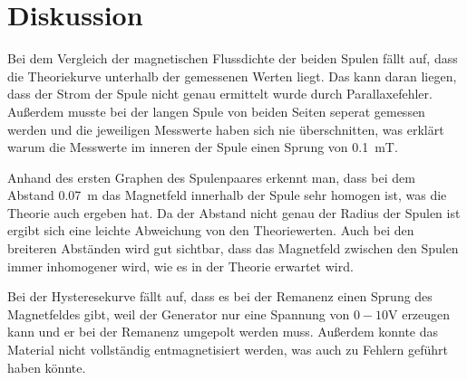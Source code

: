 \section{Diskussion}

Bei dem Vergleich der magnetischen Flussdichte der beiden Spulen fällt auf, dass
die Theoriekurve unterhalb der gemessenen Werten liegt. Das kann daran liegen, dass
der Strom der Spule nicht genau ermittelt wurde durch Parallaxefehler. Außerdem
musste bei der langen Spule von beiden Seiten seperat gemessen werden und die jeweiligen
Messwerte haben sich nie überschnitten, was erklärt warum die Messwerte im inneren
der Spule einen Sprung von \SI{0.1}{\milli\tesla}.

Anhand des ersten Graphen des Spulenpaares erkennt man, dass bei dem Abstand \SI{0.07}{\meter}
das Magnetfeld innerhalb der Spule sehr homogen ist, was die Theorie auch ergeben hat.
Da der Abstand nicht genau der Radius der Spulen ist ergibt sich eine leichte Abweichung
von den Theoriewerten. Auch bei den breiteren Abständen wird gut sichtbar, dass
das Magnetfeld zwischen den Spulen immer inhomogener wird, wie es in der Theorie
erwartet wird.

Bei der Hysteresekurve fällt auf, dass es bei der Remanenz einen Sprung des Magnetfeldes
gibt, weil der Generator nur eine Spannung von $0-10\si{\volt}$ erzeugen kann und
er bei der Remanenz umgepolt werden muss. Außerdem konnte das Material nicht vollständig
entmagnetisiert werden, was auch zu Fehlern geführt haben könnte. 

